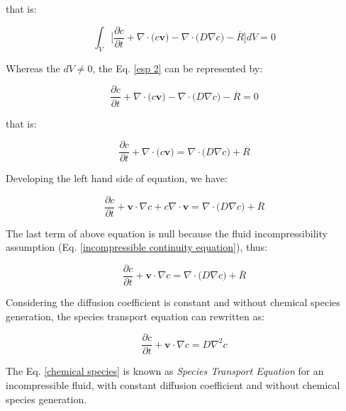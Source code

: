 \medskip
\noindent
that is:

\begin{equation} \label{esp 2}
 \int_{V} \Bigg[ \frac{\partial c}{\partial t}
 + 
 \nabla \cdot \big( c \textbf{v} \big)
 -
 \nabla \cdot \big( D \nabla c \big)
 -
 \overset{.}{R} \Bigg] dV = 0
\end{equation}



\medskip
\noindent
Whereas the $dV \neq 0$,
the Eq. \ref{esp 2} can be represented by:

\begin{equation}
 \frac{\partial c}{\partial t}
 + 
 \nabla \cdot \big( c \textbf{v} \big)
 -
 \nabla \cdot \big( D \nabla c \big)
 -
 \overset{.}{R} = 0
\end{equation}



\medskip
\noindent
that is:

\begin{equation}
 \frac{\partial c}{\partial t}
 +
 \nabla \cdot \big( c \textbf{v} \big)
 =
 \nabla \cdot \big( D \nabla c \big)
 +
 \overset{.}{R}
\end{equation}

\medskip
\noindent
Developing the left hand side of equation, we have:

\begin{equation}
 \frac{\partial c}{\partial t}
 +
 \textbf{v} \cdot \nabla c
 + 
 c \nabla \cdot \textbf{v}
 =
 \nabla \cdot \big( D \nabla c \big)
 +
 \overset{.}{R}
\end{equation}

\medskip
The last term of above equation is null because the
fluid incompressibility assumption
(Eq. \ref{incompressible continuity equation}),
thus:

\begin{equation}
 \frac{\partial c}{\partial t}
 +
 \textbf{v} \cdot \nabla c
 =
 \nabla \cdot \big( D \nabla c \big)
 +
 \overset{.}{R}
\end{equation}

\newpage
Considering the diffusion coefficient
is constant and without chemical species
generation,
the species transport equation can rewritten as:

\begin{equation} \label{chemical species}
 \frac{\partial c}{\partial t}
 +
 \textbf{v} \cdot \nabla c
 =
 D \nabla^{2} c
\end{equation}

\medskip
\noindent
The Eq. \ref{chemical species} is known as
\textit{Species Transport Equation}
for an incompressible fluid, with constant diffusion coefficient
and without chemical species generation.
